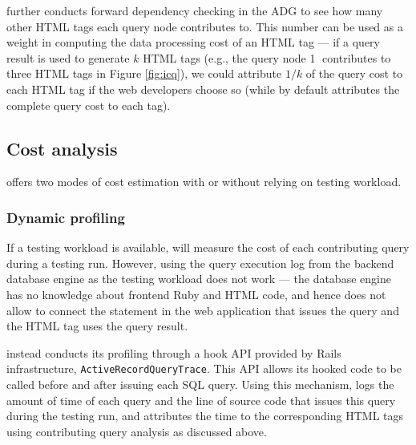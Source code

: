 \ToolP further conducts forward dependency checking in the ADG to see how many other
HTML tags each query node contributes to. This number can be used
as a weight in computing the data processing cost of an HTML tag
--- if a query result is used to generate $k$ HTML tags
(e.g., the query node {\large \textcircled{\small 1}} contributes to three HTML tags in Figure \ref{fig:icq}), 
we could attribute $1/k$ of the query cost to each HTML tag if the web developers
choose so (while by default \ToolP attributes the complete query cost to each tag).

\subsection{Cost analysis}


\ToolP offers two modes of cost estimation with or without relying on testing workload.

\subsubsection{Dynamic profiling}
\label{sec:profile_dynamic}

If a testing workload is available, \ToolP
will measure the cost of each contributing query during a 
testing run. However, using 
the query execution log from the backend database engine as the testing workload does not work ---
the database engine has no knowledge about frontend Ruby and HTML code, 
and hence does not allow \ToolP to connect the statement in the web application that issues the query and the HTML tag uses the query result.

\ToolP instead conducts its profiling through a hook API provided by Rails infrastructure, 
{\tt ActiveRecordQueryTrace}. This API allows its hooked code to be called before and after
issuing each SQL query. 
Using this mechanism, \ToolP logs the amount of time of each query and the line of source code that
issues this query during the testing run, and attributes the time to the corresponding HTML tags using 
contributing query analysis as discussed above.


